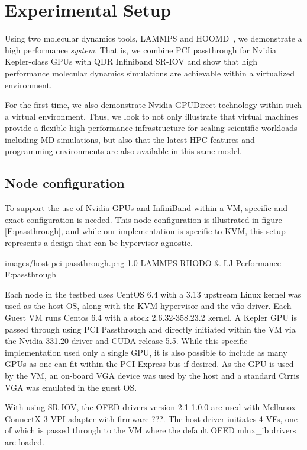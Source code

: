 \documentclass{sigplanconf}
\begin{document}
\section{Experimental Setup}

Using two molecular dynamics tools, LAMMPS\cite{plimpton2007lammps} and HOOMD~\cite{anderson2010hoomd}, we demonstrate a high performance \textit{system}.  That is, we combine PCI passthrough for Nvidia Kepler-class GPUs with QDR Infiniband SR-IOV and show that high performance molecular dynamics simulations are achievable within a virtualized environment. 

For the first time, we also demonstrate Nvidia GPUDirect technology within such a virtual environment.  Thus, we look to not only illustrate that virtual machines provide a flexible high performance infrastructure for scaling scientific workloads including MD simulations, but also that the latest HPC features and programming environments are also available in this same model.   

\subsection{Node configuration}

To support the use of Nvidia GPUs and InfiniBand within a VM, specific and exact configuration is needed. This node configuration is illustrated in figure \ref{F:passthrough}, and while our implementation is specific to KVM, this setup represents a design that can be hypervisor agnostic.

  {images/host-pci-passthrough.png}
  {1.0}
  {LAMMPS RHODO \& LJ Performance}
  {F:passthrough}


Each node in the testbed uses CentOS 6.4 with a 3.13 upstream Linux kernel was used as the host OS, along with the KVM hypervisor and the vfio driver. 
Each Guest VM runs Centos 6.4 with a stock 2.6.32-358.23.2 kernel.
A Kepler GPU is passed through using PCI Passthrough and directly initiated within the VM via the Nvidia 331.20 driver and CUDA release 5.5. While this specific implementation used only a single GPU, it is also possible to include as many GPUs as one can fit within the PCI Express bus if desired. As the GPU is used by the VM, an on-board VGA device was used by the host and a standard Cirris VGA was emulated in the guest OS. 

With using SR-IOV, the OFED drivers version 2.1-1.0.0 are used with Mellanox ConnectX-3 VPI adapter with firmware ???.  The host driver initiates 4 VFs, one of which is passed through to the VM where the default OFED mlnx\_ib drivers are loaded.  
\end{document}
